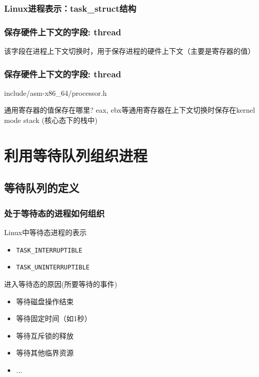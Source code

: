 \documentclass[xcolor=svgnames]{beamer}
\begin{document}
\begin{CJK*}{UTF8}{gbsn}
\begin{frame}[fragile]
\frametitle{Linux进程表示：task\_struct结构}
\frametitle{保存硬件上下文的字段: thread}
\lstthreadintask

该字段在进程上下文切换时，用于保存进程的硬件上下文（主要是寄存器的值）
\end{frame}

\begin{frame}[fragile]
\frametitle{保存硬件上下文的字段: thread}
\begin{block}{include/asm-x86\_64/processor.h}
\lstthreadstruct
\end{block}
\begin{block}{通用寄存器的值保存在哪里?}
\alert{eax}, \alert{ebx}等通用寄存器在上下文切换时保存在kernel mode stack (核心态下的栈中)
\end{block}
\end{frame}

\section{利用等待队列组织进程}

\subsection{等待队列的定义}

\begin{frame}[fragile]
\frametitle{处于等待态的进程如何组织}
\begin{block}{Linux中等待态进程的表示}
\begin{itemize}
\item \verb|TASK_INTERRUPTIBLE|
\item \verb|TASK_UNINTERRUPTIBLE|
\end{itemize}
\end{block}
\begin{block}{进入等待态的原因(所要等待的事件)}
\begin{itemize}
\item 等待磁盘操作结束
\item 等待固定时间（如1秒）
\item 等待互斥锁的释放
\item 等待其他临界资源
\item ...
\end{itemize}
\end{block}
\end{frame}


\end{CJK*}
\end{document}
